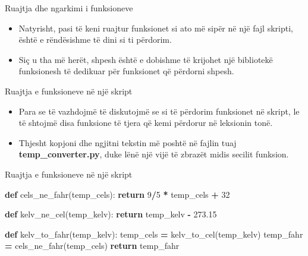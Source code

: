 \documentclass[
  ignorenonframetext,
]{beamer}
\newenvironment{Shaded}{\begin{snugshade}}{\end{snugshade}}
\newcommand{\ControlFlowTok}[1]{\textcolor[rgb]{0.13,0.29,0.53}{\textbf{#1}}}
\newcommand{\DecValTok}[1]{\textcolor[rgb]{0.00,0.00,0.81}{#1}}
\newcommand{\FloatTok}[1]{\textcolor[rgb]{0.00,0.00,0.81}{#1}}
\newcommand{\KeywordTok}[1]{\textcolor[rgb]{0.13,0.29,0.53}{\textbf{#1}}}
\newcommand{\NormalTok}[1]{#1}
\newcommand{\OperatorTok}[1]{\textcolor[rgb]{0.81,0.36,0.00}{\textbf{#1}}}
\begin{document}
\begin{frame}{Ruajtja dhe ngarkimi i funksioneve}
\protect\hypertarget{ruajtja-dhe-ngarkimi-i-funksioneve}{}
\begin{itemize}
\item
  Natyrisht, pasi të keni ruajtur funksionet si ato më sipër në një fajl
  skripti, është e rëndësishme të dini si ti përdorim.
\item
  Siç u tha më herët, shpesh është e dobishme të krijohet një bibliotekë
  funksionesh të dedikuar për funksionet që përdorni shpesh.
\end{itemize}
\end{frame}

\begin{frame}{Ruajtja e funksioneve në një skript}
\protect\hypertarget{ruajtja-e-funksioneve-nuxeb-njuxeb-skript}{}
\begin{itemize}
\item
  Para se të vazhdojmë të diskutojmë se si të përdorim funksionet në
  skript, le të shtojmë disa funksione të tjera që kemi përdorur në
  leksionin tonë.
\item
  Thjesht kopjoni dhe ngjitni tekstin më poshtë në fajlin tuaj
  \textbf{temp\_converter.py}, duke lënë një vijë të zbrazët midis
  secilit funksion.
\end{itemize}
\end{frame}

\begin{frame}[fragile]{Ruajtja e funksioneve në një skript}
\protect\hypertarget{ruajtja-e-funksioneve-nuxeb-njuxeb-skript-1}{}
\begin{Shaded}
\begin{Highlighting}[]
\KeywordTok{def}\NormalTok{ cels\_ne\_fahr(temp\_cels):}
    \ControlFlowTok{return} \DecValTok{9}\OperatorTok{/}\DecValTok{5} \OperatorTok{*}\NormalTok{ temp\_cels }\OperatorTok{+} \DecValTok{32}

\KeywordTok{def}\NormalTok{ kelv\_ne\_cel(temp\_kelv):}
    \ControlFlowTok{return}\NormalTok{ temp\_kelv }\OperatorTok{{-}} \FloatTok{273.15}

\KeywordTok{def}\NormalTok{ kelv\_to\_fahr(temp\_kelv):}
\NormalTok{    temp\_cels }\OperatorTok{=}\NormalTok{ kelv\_to\_cel(temp\_kelv)}
\NormalTok{    temp\_fahr }\OperatorTok{=}\NormalTok{ cels\_ne\_fahr(temp\_cels)}
    \ControlFlowTok{return}\NormalTok{ temp\_fahr}
\end{Highlighting}
\end{Shaded}
\end{frame}
\end{document}
